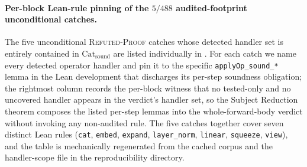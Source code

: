 \paragraph{Per-block Lean-rule pinning of the
$5/488$ audited-footprint unconditional catches.}
The five unconditional \textsc{Refuted-Proof} catches whose
detected handler set is entirely contained in
$\mathrm{Cat}_{\mathrm{sound}}$ are listed individually in
. For each catch we
name every detected operator handler and pin it to the
specific \texttt{applyOp\_sound\_*} lemma in the Lean
development that discharges its per-step soundness obligation;
the rightmost column records the per-block witness that no
tested-only and no uncovered handler appears in the verdict's
handler set, so the Subject Reduction theorem composes the
listed per-step lemmas into the whole-forward-body verdict
without invoking any non-audited rule. The five catches together
cover seven distinct Lean rules
(\texttt{cat}, \texttt{embed}, \texttt{expand},
\texttt{layer\_norm}, \texttt{linear},
\texttt{squeeze}, \texttt{view}), and the table is
mechanically regenerated from the cached corpus and the
handler-scope file in the reproducibility directory.



